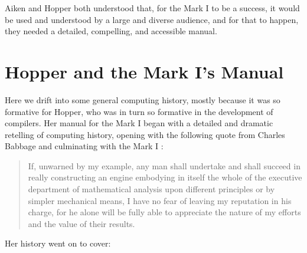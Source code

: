 Aiken and Hopper both understood that, for the Mark I to be a success, it would be used and
understood by a large and diverse audience, and for that to happen, they needed a detailed,
compelling, and accessible manual.


\section{Hopper and the Mark I's Manual}

Here we drift into some general computing history, mostly because it was so 
formative for Hopper, who was in turn so formative in the development of 
compilers.
Her manual for the Mark I began with a detailed and dramatic retelling of
computing history, opening with the following quote from Charles Babbage and
culminating with the Mark I
\cite{annals_of_the_computation_laboratory_of_harvard_university_1946}:

\begin{quotation}
If, unwarned by my example, any man shall undertake and shall succeed in 
really constructing an engine embodying in itself the whole of the executive 
department of mathematical analysis upon different principles or by simpler 
mechanical means, I have no fear of leaving my reputation in his charge, for he 
alone will be fully able to appreciate the nature of my efforts and the value 
of their results.
\end{quotation}

Her history went on to cover:

